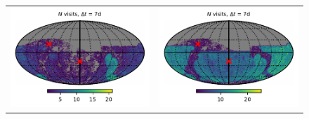 \documentclass[preprintm,linenumbers]{aastex631}
\begin{document}
\begin{figure}
\begin{tabular}{@{}c@{}c@{}}
         \includegraphics{results/skymaps_cutout/skymaps_cutout_first_year_one_snap_v4_0_10yrs_db_noDD_noTwi_tscale-7_nside-256_doAllTemplateMetrics_reduceCount_g_noDD_noTwi.pdf} &
         \includegraphics{results/skymaps_cutout/skymaps_cutout_first_year_one_snap_v4_0_10yrs_db_noDD_noTwi_tscale-7_nside-256_doAllTemplateMetrics_reduceCount_r_noDD_noTwi.pdf} \\


\end{tabular}
\end{figure}
\end{document}
